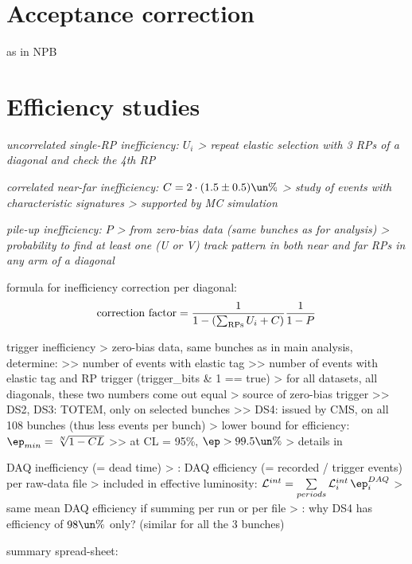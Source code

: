 \section{Acceptance correction}

\> as in NPB

\section{Efficiency studies}

\iffalse
\> \em{uncorrelated single-RP inefficiency}: $U_i$
\>> repeat elastic selection with 3 RPs of a diagonal and check the 4th RP

\> \em{correlated near-far inefficiency}: $C = 2\cdot (1.5 \pm 0.5)\un{\%}$
\>> study of events with characteristic signatures
\>> supported by MC simulation

\> \em{pile-up inefficiency}: $P$
\>> from zero-bias data (same bunches as for analysis)
\>> probability to find at least one (U or V) track pattern in both near and far RPs in any arm of a diagonal

\> formula for inefficiency correction per diagonal:\cBlack
$$\hbox{correction factor} = {1\over 1 - (\sum_{\rm RPs} U_i + C)} {1\over 1 - P}$$

\> trigger inefficiency
\>> zero-bias data, same bunches as in main analysis, determine:
\>>> number of events with elastic tag
\>>> number of events with elastic tag and RP trigger (trigger\_bits \& 1 == true)
\>> for all datasets, all diagonals, these two numbers come out equal
\>> source of zero-bias trigger
\>>> DS2, DS3: TOTEM, only on selected bunches
\>>> DS4: issued by CMS, on all 108 bunches (thus less events per bunch)
\>> lower bound for efficiency: $\ep_{min} = \root N \of {1 - CL}$
\>>> at CL = 95\%, $\ep > 99.5\un{\%}$
\>> details in 

\> DAQ inefficiency (= dead time)
\>>  : DAQ efficiency
(= recorded / trigger events) per raw-data file
\>> included in effective luminosity: ${\cal L}^{int} = \sum\limits_{periods} {\cal L}_i^{int} \,\ep_i^{DAQ}$
\>> same mean DAQ efficiency if summing per run or per file
\>> \TODO: why DS4 has efficiency of $98\un{\%}$ only? (similar for all the 3 bunches)

\> summary spread-sheet: 

